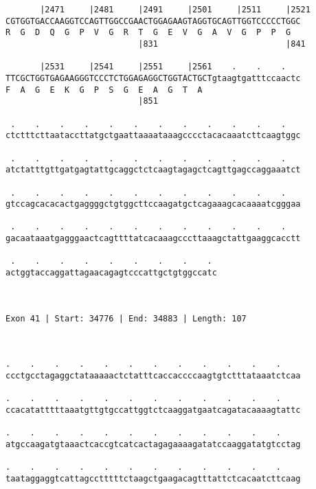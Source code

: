 \documentclass{article}
\begin{document}
\begin{Verbatim}
       |2471     |2481     |2491     |2501     |2511     |2521
CGTGGTGACCAAGGTCCAGTTGGCCGAACTGGAGAAGTAGGTGCAGTTGGTCCCCCTGGC
R  G  D  Q  G  P  V  G  R  T  G  E  V  G  A  V  G  P  P  G  
                           |831                          |841
  
       |2531     |2541     |2551     |2561    .    .    .   
TTCGCTGGTGAGAAGGGTCCCTCTGGAGAGGCTGGTACTGCTgtaagtgatttccaactc
F  A  G  E  K  G  P  S  G  E  A  G  T  A                    
                           |851                             
  
 .    .    .    .    .    .    .    .    .    .    .    .   
ctctttcttaataccttatgctgaattaaaataaagcccctacacaaatcttcaagtggc
                                                            
 .    .    .    .    .    .    .    .    .    .    .    .   
atctatttgttgatgagtattgcaggctctcaagtagagctcagttgagccaggaaatct
                                                            
 .    .    .    .    .    .    .    .    .    .    .    .   
gtccagcacacactgaggggctgtggcttccaagatgctcagaaagcacaaaatcgggaa
                                                            
 .    .    .    .    .    .    .    .    .    .    .    .   
gacaataaatgagggaactcagttttatcacaaagcccttaaagctattgaaggcacctt
                                                            
 .    .    .    .    .    .    .    .    . 
actggtaccaggattagaacagagtcccattgctgtggccatc
                                           
                                           
 
Exon 41 | Start: 34776 | End: 34883 | Length: 107



.    .    .    .    .    .    .    .    .    .    .    .    
ccctgcctagaggctataaaaactctatttcaccaccccaagtgtctttataaatctcaa
                                                            
.    .    .    .    .    .    .    .    .    .    .    .    
ccacatatttttaaatgttgtgccattggtctcaaggatgaatcagatacaaaagtattc
                                                            
.    .    .    .    .    .    .    .    .    .    .    .    
atgccaagatgtaaactcaccgtcatcactagagaaaagatatccaaggatatgtcctag
                                                            
.    .    .    .    .    .    .    .    .    .    .    .    
taataggaggtcattagcctttttctaagctgaagacagtttattctcacaatcttcaag
                                                            

\end{Verbatim}
\end{document}
